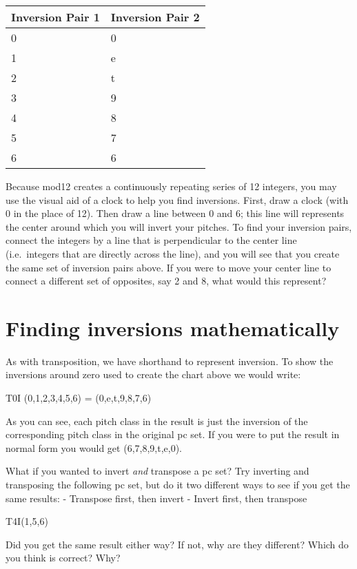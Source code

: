 \documentclass{book}
\begin{document}
\begin{longtable}[]{@{}ll@{}}
\toprule
Inversion Pair 1 & Inversion Pair 2 \\
\midrule
\endhead
0 & 0 \\
1 & e \\
2 & t \\
3 & 9 \\
4 & 8 \\
5 & 7 \\
6 & 6 \\
\bottomrule
\end{longtable}

Because mod12 creates a continuously repeating series of 12 integers, you may
use the visual aid of a clock to help you find inversions. First, draw a clock
(with 0 in the place of 12). Then draw a line between 0 and 6; this line will
represents the center around which you will invert your pitches. To find your
inversion pairs, connect the integers by a line that is perpendicular to the
center line (i.e.~integers that are directly across the line), and you will
see that you create the same set of inversion pairs above. If you were to move
your center line to connect a different set of opposites, say 2 and 8, what
would this represent?

\hypertarget{finding-inversions-mathematically}{%
\section{Finding inversions
mathematically}\label{finding-inversions-mathematically}}

As with transposition, we have shorthand to represent inversion. To show the
inversions around zero used to create the chart above we would write:

T0I (0,1,2,3,4,5,6) = (0,e,t,9,8,7,6)

As you can see, each pitch class in the result is just the inversion of the
corresponding pitch class in the original pc set. If you were to put the
result in normal form you would get (6,7,8,9,t,e,0).

What if you wanted to invert \emph{and} transpose a pc set? Try inverting and
transposing the following pc set, but do it two different ways to see if you
get the same results: - Transpose first, then invert - Invert first, then
transpose

T4I(1,5,6)

Did you get the same result either way? If not, why are they different? Which
do you think is correct? Why?
\end{document}
